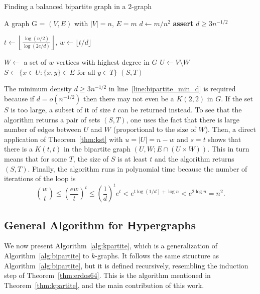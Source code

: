 \begin{algorithm}[H]
    \caption{Finding a balanced bipartite graph in a $2$-graph}
    \label{alg:bipartite}
        \begin{algorithmic}[1]
        \Require A graph G = $(V, E)$ with $|V| = n$, $E = m$
        \State $d \gets m / n^2 $
        \State \textbf{assert} $d \geq 3 n^{-1/2}$ \label{line:bipartite_min_d}

        \State $t \gets \left\lfloor\frac{\log (n/2) }
        {\log (2e/d)}\right\rfloor,\, w \gets \lfloor t/d \rfloor$

        \State $W \gets $ a set of $w$ vertices with highest degree in $G$
        \State $U \gets V \setminus W$
         \label{line:2partite_for}
            \State $S \gets \{x \in U \colon \{x, y\} \in E \text{ for all } y \in T\}$
                \State \Return $(S, T)$
            \EndIf
        \EndFor
        \end{algorithmic}
\end{algorithm}

The minimum density $d \geq 3n^{-1/2}$ in line~\ref{line:bipartite_min_d} is required
because if $d = o\left(n^{-1/2}\right)$ then
there may not even be a $K(2, 2)$ in $G$.
If the set $S$ is too large, a subset of it of size $t$ can be returned instead.
To see that the algorithm returns a pair of sets $(S, T)$, one uses the fact that
there is large number of edges between $U$ and $W$ (proportional to the size of $W$).
Then, a direct application of Theorem~\ref{thm:kst}
with $u = |U| = n - w$ and $s = t$ shows that
there is a $K(t, t)$ in the bipartite graph $(U, W; E \cap (U \times W))$.
This in turn means that for some $T$,
the size of $S$ is at least $t$
and the algorithm returns $(S, T)$.
Finally, the algorithm runs in polynomial time because 
the  number of iterations of the loop is
\[
    \binom{w}{t} \leq
    \left(\frac{ew}{t}\right)^t \leq
    \left(\frac{1}{d}\right)^t e^t < e^{t \log (1/d) + \log n} <
    e^{2\log n} = n^2.
\]

\subsection{General Algorithm for Hypergraphs} \label{subsec:algorithm-for-k-graphs}

We now present Algorithm~\ref{alg:kpartite}, which is
a generalization of Algorithm~\ref{alg:bipartite} to $k$-graphs.
It follows the same structure as Algorithm~\ref{alg:bipartite},
but it is defined recursively, resembling the induction step of Theorem~\ref{thm:erdos64}.
This is the algorithm mentioned in Theorem~\ref{thm:kpartite},
and the main contribution of this work.

